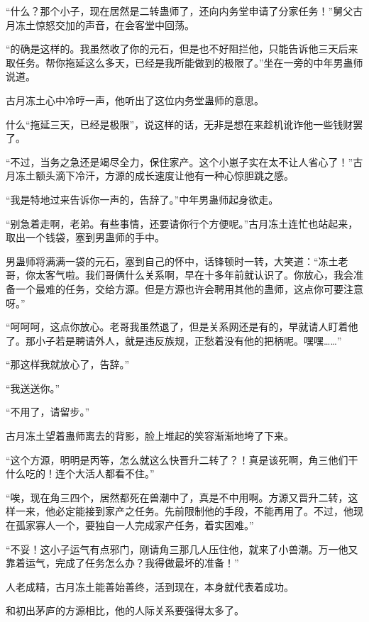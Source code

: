 
\begin{this_body}

“什么？那个小子，现在居然是二转蛊师了，还向内务堂申请了分家任务！”舅父古月冻土惊怒交加的声音，在会客堂中回荡。

“的确是这样的。我虽然收了你的元石，但是也不好阻拦他，只能告诉他三天后来取任务。帮你拖延这么多天，已经是我所能做到的极限了。”坐在一旁的中年男蛊师说道。

古月冻土心中冷哼一声，他听出了这位内务堂蛊师的意思。

什么“拖延三天，已经是极限”，说这样的话，无非是想在来趁机讹诈他一些钱财罢了。

“不过，当务之急还是竭尽全力，保住家产。这个小崽子实在太不让人省心了！”古月冻土额头滴下冷汗，方源的成长速度让他有一种心惊胆跳之感。

“我是特地过来告诉你一声的，告辞了。”中年男蛊师起身欲走。

“别急着走啊，老弟。有些事情，还要请你行个方便呢。”古月冻土连忙也站起来，取出一个钱袋，塞到男蛊师的手中。

男蛊师将满满一袋的元石，塞到自己的怀中，话锋顿时一转，大笑道：“冻土老哥，你太客气啦。我们哥俩什么关系啊，早在十多年前就认识了。你放心，我会准备一个最难的任务，交给方源。但是方源也许会聘用其他的蛊师，这点你可要注意呀。”

“呵呵呵，这点你放心。老哥我虽然退了，但是关系网还是有的，早就请人盯着他了。那小子若是聘请外人，就是违反族规，正愁着没有他的把柄呢。嘿嘿……”

“那这样我就放心了，告辞。”

“我送送你。”

“不用了，请留步。”

古月冻土望着蛊师离去的背影，脸上堆起的笑容渐渐地垮了下来。

“这个方源，明明是丙等，怎么就这么快晋升二转了？！真是该死啊，角三他们干什么吃的！连个大活人都看不住。”

“唉，现在角三四个，居然都死在兽潮中了，真是不中用啊。方源又晋升二转，这样一来，他必定能接到家产之任务。先前限制他的手段，不能再用了。不过，他现在孤家寡人一个，要独自一人完成家产任务，着实困难。”

“不妥！这小子运气有点邪门，刚请角三那几人压住他，就来了小兽潮。万一他又靠着运气，完成了任务怎么办？我得做最坏的准备！”

人老成精，古月冻土能善始善终，活到现在，本身就代表着成功。

和初出茅庐的方源相比，他的人际关系要强得太多了。


\end{this_body}
